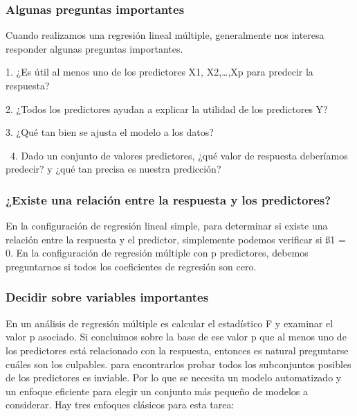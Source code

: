 \documentclass[
  letterpaper,
  DIV=11,
  numbers=noendperiod]{scrartcl}
\begin{document}
\hypertarget{algunas-preguntas-importantes}{%
\subsubsection{\texorpdfstring{\textbf{Algunas preguntas
importantes}}{Algunas preguntas importantes}}\label{algunas-preguntas-importantes}}

Cuando realizamos una regresión lineal múltiple, generalmente nos
interesa responder algunas preguntas importantes.

1. ¿Es útil al menos uno de los predictores X1, X2,\ldots,Xp para
predecir la respuesta?

2. ¿Todos los predictores ayudan a explicar la utilidad de los
predictores Y?

3. ¿Qué tan bien se ajusta el modelo a los datos?

~4. Dado un conjunto de valores predictores, ¿qué valor de respuesta
deberíamos predecir? y ¿qué tan precisa es nuestra predicción?

\hypertarget{existe-una-relaciuxf3n-entre-la-respuesta-y-los-predictores}{%
\subsubsection{\texorpdfstring{\textbf{¿Existe una relación entre la
respuesta y los
predictores?}}{¿Existe una relación entre la respuesta y los predictores?}}\label{existe-una-relaciuxf3n-entre-la-respuesta-y-los-predictores}}

En la configuración de regresión lineal simple, para determinar si
existe una relación entre la respuesta y el predictor, simplemente
podemos verificar si ß1 = 0. En la configuración de regresión múltiple
con p predictores, debemos preguntarnos si todos los coeficientes de
regresión son cero.

\hypertarget{decidir-sobre-variables-importantes}{%
\subsubsection{\texorpdfstring{\textbf{Decidir sobre variables
importantes}}{Decidir sobre variables importantes}}\label{decidir-sobre-variables-importantes}}

En un análisis de regresión múltiple es calcular el estadístico F y
examinar el valor p asociado. Si concluimos sobre la base de ese valor p
que al menos uno de los predictores está relacionado con la respuesta,
entonces es natural preguntarse cuáles son los culpables. para
encontrarlos probar todos los subconjuntos posibles de los predictores
es inviable. Por lo que se necesita un modelo automatizado y un enfoque
eficiente para elegir un conjunto más pequeño de modelos a considerar.
Hay tres enfoques clásicos para esta tarea:
\end{document}
